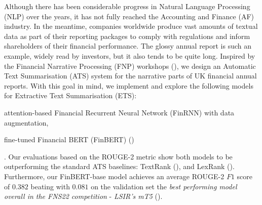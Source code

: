 Although there has been considerable progress in Natural Language Processing (NLP) over the years, it has not fully reached the Accounting and Finance (AF) industry.
In the meantime, companies worldwide produce vast amounts of textual data as part of their reporting packages to comply with regulations and inform shareholders of their financial performance.
The glossy annual report is such an example, widely read by investors, but it also tends to be quite long.
Inspired by the Financial Narrative Processing (FNP) workshops (\cite{zmandar-etal-2021-financial, fnp-2022-financial}),
we design an Automatic Text Summarisation (ATS) system for the narrative parts of UK financial annual reports.
With this goal in mind, we implement and explore the following models for Extractive Text Summarisation (ETS):
\begin{enumerate*}
    \item attention-based Financial Recurrent Neural Network (FinRNN) with data augmentation,
    \item fine-tuned Financial BERT (FinBERT) (\cite{yang2020finbert})
\end{enumerate*}.
Our evaluations based on the ROUGE-2 metric show both models to be outperforming the standard ATS baselines: TextRank (\cite{mihalcea-tarau-2004-textrank}), and LexRank (\cite{Erkan2004LexRankGC}).
Furthermore, our FinBERT-base model achieves an average ROUGE-2 $F1$ score of $0.382$ beating with $0.081$ on the
validation set the \emph{best performing model overall in the FNS22 competition} - \emph{LSIR's mT5} (\cite{foroutan-etal-2022-multilingual}).
